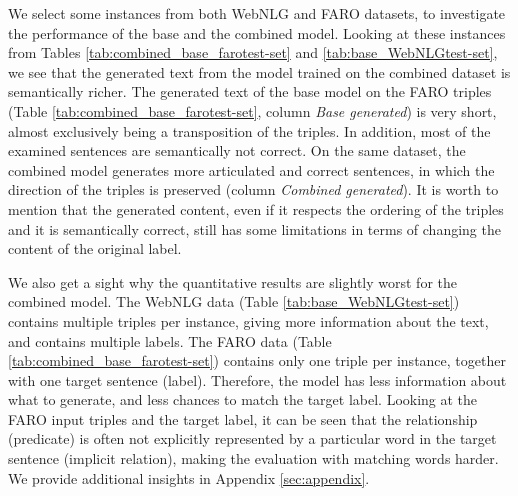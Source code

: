 \documentclass[
hf, %
]{ceurart}
\begin{document}
We select some instances from both WebNLG and FARO datasets, to investigate the performance of the base and the combined model. Looking at these instances from Tables \ref{tab:combined_base_farotest-set} and \ref{tab:base_WebNLGtest-set}, we see that the generated text from the model trained on the combined dataset is semantically richer. The generated text of the base model on the FARO triples (Table \ref{tab:combined_base_farotest-set}, column \textit{Base generated}) is very short, almost exclusively being a transposition of the triples. In addition, most of the examined sentences are semantically not correct. On the same dataset, the combined model generates more articulated and correct sentences, in which the direction of the triples is preserved (column \textit{Combined generated}). It is worth to mention that the generated content, even if it respects the ordering of the triples and it is semantically correct, still has some limitations in terms of changing the content of the original label. %


We also get a sight why the quantitative results are slightly worst for the combined model. The WebNLG data (Table \ref{tab:base_WebNLGtest-set}) contains multiple triples per instance, giving more information about the text, and contains multiple labels. The FARO data (Table \ref{tab:combined_base_farotest-set}) contains only one triple per instance, together with one target sentence (label). Therefore, the model has less information about what to generate, and less chances to match the target label. Looking at the FARO input triples and the target label, it can be seen that the relationship (predicate) is often not explicitly represented by a particular word in the target sentence (implicit relation), making the evaluation with matching words harder. We provide additional insights in Appendix \ref{sec:appendix}.
\end{document}
